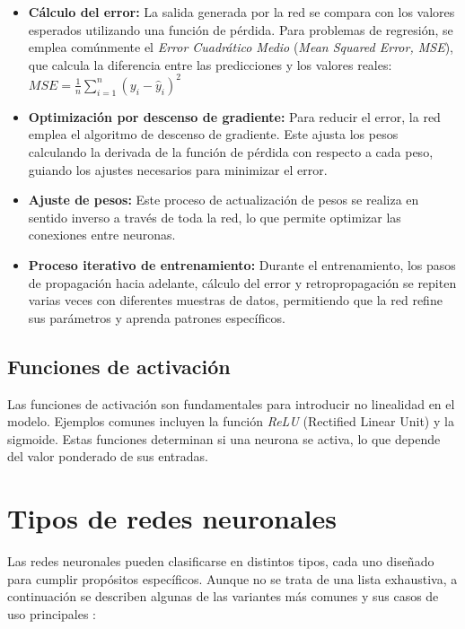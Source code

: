 \begin{itemize}
	\item \textbf{Cálculo del error:} La salida generada por la red se compara con los valores esperados utilizando una función de pérdida. Para problemas de regresión, se emplea comúnmente el \textit{Error Cuadrático Medio} (\textit{Mean Squared Error, MSE}), que calcula la diferencia entre las predicciones y los valores reales:  
	$ {MSE} = \frac{1}{n} \sum_{i=1}^{n} (y_i - \hat{y}_i)^2 $
	
	\item \textbf{Optimización por descenso de gradiente:} Para reducir el error, la red emplea el algoritmo de descenso de gradiente. Este ajusta los pesos calculando la derivada de la función de pérdida con respecto a cada peso, guiando los ajustes necesarios para minimizar el error.  
	
	\item \textbf{Ajuste de pesos:} Este proceso de actualización de pesos se realiza en sentido inverso a través de toda la red, lo que permite optimizar las conexiones entre neuronas.  
	
	\item \textbf{Proceso iterativo de entrenamiento:} Durante el entrenamiento, los pasos de propagación hacia adelante, cálculo del error y retropropagación se repiten varias veces con diferentes muestras de datos, permitiendo que la red refine sus parámetros y aprenda patrones específicos.
\end{itemize}


\subsection{Funciones de activación}
Las funciones de activación son fundamentales para introducir no linealidad en el modelo. Ejemplos comunes incluyen la función \textit{ReLU} (Rectified Linear Unit) y la sigmoide. Estas funciones determinan si una neurona se activa, lo que depende del valor ponderado de sus entradas.


\section{Tipos de redes neuronales}

Las redes neuronales pueden clasificarse en distintos tipos, cada uno diseñado para cumplir propósitos específicos. Aunque no se trata de una lista exhaustiva, a continuación se describen algunas de las variantes más comunes y sus casos de uso principales \cite{L11}:


